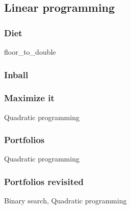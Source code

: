 \documentclass[10pt,a4paper,landscape,twocolumn,twoside]{article}
\begin{document}
	\newpage
	\subsection{Linear programming}
	\label{sub:Linear programming}

		\subsubsection{Diet}
		\label{subs:Diet}
		\begin{keywords}floor\_to\_double\end{keywords}
		

		\subsubsection{Inball}
		\label{subs:Inball}
		\begin{keywords}\end{keywords}
		

		\subsubsection{Maximize it}
		\label{subs:Maximize}
		\begin{keywords}Quadratic programming\end{keywords}
		

		\subsubsection{Portfolios}
		\label{subs:Portfolios}
		\begin{keywords}Quadratic programming\end{keywords}
		

		\subsubsection{Portfolios revisited}
		\label{subs:Portfolios revisited}
		\begin{keywords}Binary search, Quadratic programming\end{keywords}
		
\end{document}
